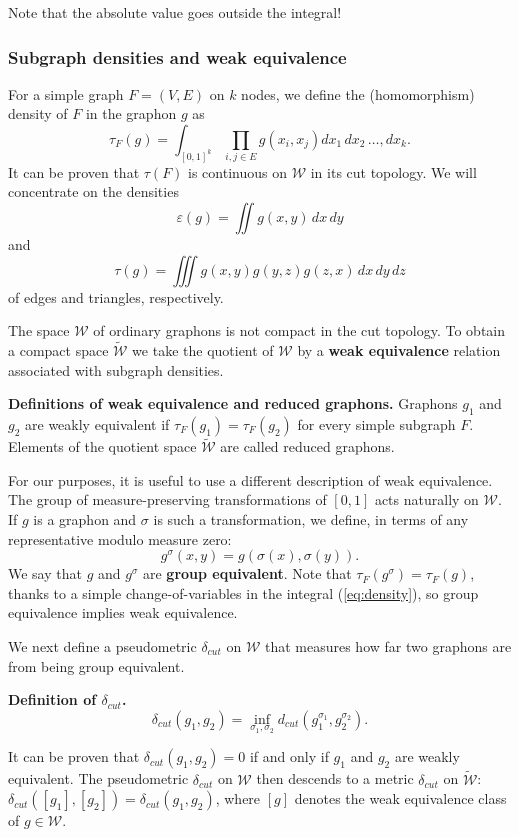 \documentclass[12pt]{amsart}
\newcommand\be{\begin{equation}}
\newcommand\ee{\end{equation}}
\newcommand{\tdens}{\tau}
\newcommand{\edens}{\varepsilon}
\newcommand{\regular}{\mathcal{W}}
\newcommand{\reduced}{\widetilde {\mathcal{W}}}
\begin{document}
{Note that the absolute value goes outside the
integral! 


\subsubsection{Subgraph densities and weak equivalence}\phantom{asdf}

For a simple graph  $F=(V,E)$ on $k$ nodes, we
define the (homomorphism) density of $F$ in the graphon $g$ as
\be \label{eq:density} \tdens_F(g) = \int_{[0,1]^k} \prod_{{i,j}\in E} g(x_i,x_j) dx_1\,dx_2\,\ldots,dx_k.
\ee
It can be proven \cite{Ch} that $\tdens(F)$ is continuous on $\regular$ in its cut topology.
We will concentrate on the densities 
\be \edens(g) = \iint g(x,y) \, dx \, dy \ee
and
\be \tdens(g)  = \iiint g(x,y) g(y,z) g(z,x) \, dx \, dy \, dz\ee
of edges and triangles, respectively. 

The space $\regular$ of ordinary graphons is not
compact in  the cut topology. To obtain a compact space $\reduced$ we take the
quotient of $\regular$ by a {\bf weak equivalence}
relation associated with subgraph densities.


\noindent \textbf{Definitions of weak equivalence and reduced graphons.} 
Graphons $g_1$ and $g_2$ are {weakly equivalent} 
if $\tdens_F(g_1)=\tdens_F(g_2)$ for every simple subgraph $F$. Elements of the quotient space $\reduced$ are called reduced graphons.

For our purposes, it is useful to use a different description of weak equivalence. 
The group of measure-preserving transformations of 
$[0,1]$ acts naturally on $\regular$. If $g$ is a graphon and $\sigma$ is such a 
transformation, we define, in terms of any representative modulo measure zero:
\be g^\sigma(x,y) = g(\sigma(x), \sigma(y)). \ee
We say that $g$ and $g^\sigma$ are {\bf group equivalent}. Note that $\tdens_F(g^\sigma)= \tdens_F(g)$, 
thanks to a simple change-of-variables in the integral (\ref{eq:density}), so group equivalence implies weak equivalence. 

We next define a pseudometric $\delta_{cut}$ on $\regular$ that measures how far two graphons are from 
being group equivalent.

\noindent \textbf{Definition of $\delta_{cut}$.}
\be 
\delta_{cut}(g_1,g_2)=\inf_{\sigma_1,\sigma_2} d_{cut}(g_1^{\sigma_1},g_2^{\sigma_2}). 
\ee

It can be proven \cite{Ch} that $\delta_{cut}(g_1,g_2)=0$ if and only if $g_1$ and $g_2$ are weakly equivalent.  
The pseudometric $\delta_{cut}$ on $\regular$ then descends 
to a metric $\delta_{cut}$ on 
$\reduced$: $\delta_{cut}([g_1],[g_2]) = \delta_{cut}(g_1,g_2)$, where $[g]$ denotes the weak 
equivalence class of $g\in \regular$.

}
\end{document}
